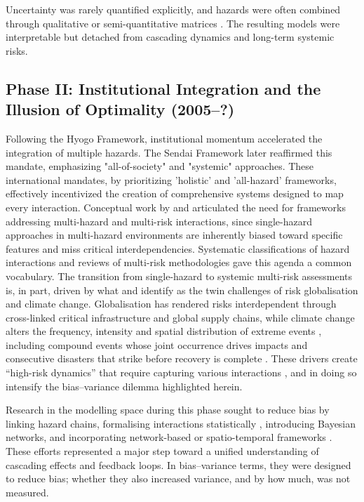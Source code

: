 \documentclass[12pt]{article}
\begin{document}
Uncertainty was rarely quantified explicitly, and hazards were often combined through qualitative or semi-quantitative matrices \citep{kappes_challenges_2012, gallina2016review}. The resulting models were interpretable but detached from cascading dynamics and long-term systemic risks.

\subsection{Phase II: Institutional Integration and the Illusion of Optimality (2005–?)}

Following the Hyogo Framework, institutional momentum accelerated the integration of multiple hazards. The Sendai Framework \citep{SendaiFramework2015} later reaffirmed this mandate, emphasizing "all-of-society" and "systemic" approaches. These international mandates, by prioritizing 'holistic' and 'all-hazard' frameworks, effectively incentivized the creation of comprehensive systems designed to map every interaction. Conceptual work by \citet{Marzocchi2009, marzocchi2012basic} and \citet{kappes_challenges_2012} articulated the need for frameworks addressing multi-hazard and multi-risk interactions, since single-hazard approaches in multi-hazard environments are inherently biased toward specific features and miss critical interdependencies. Systematic classifications of hazard interactions \citep{gill2014reviewing, gill2016hazard} and reviews of multi-risk methodologies \citep{gallina2016review} gave this agenda a common vocabulary. The transition from single-hazard to systemic multi-risk assessments is, in part, driven by what \citet{zschau20172} and \citet{hochrainer2024managing} identify as the twin challenges of risk globalisation and climate change. Globalisation has rendered risks interdependent through cross-linked critical infrastructure and global supply chains, while climate change alters the frequency, intensity and spatial distribution of extreme events \citep{seneviratne2021weather}, including compound events whose joint occurrence drives impacts \citep{zscheischler2018future, zscheischler2020typology} and consecutive disasters that strike before recovery is complete \citep{deruiter2020why}. These drivers create ``high-risk dynamics'' that require capturing various interactions \citep{pescaroli2018understanding}, and in doing so intensify the bias--variance dilemma highlighted herein.

Research in the modelling space during this phase sought to reduce bias by linking hazard chains, formalising interactions statistically \citep{selva2013long, mignan2014quantification}, introducing Bayesian networks, and incorporating network-based or spatio-temporal frameworks \citep{Tilloy2019, DeAngeli2022, Terzi2019, dunant2021multihazards, dunant2025impacts}. These efforts represented a major step toward a unified understanding of cascading effects and feedback loops. In bias--variance terms, they were designed to reduce bias; whether they also increased variance, and by how much, was not measured.
\end{document}
